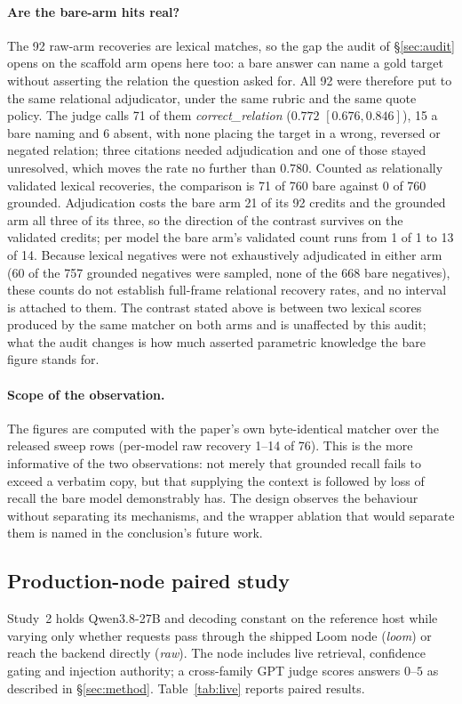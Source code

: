\documentclass[10pt,twocolumn]{article}
\begin{document}
\paragraph{Are the bare-arm hits real?} The 92 raw-arm recoveries are lexical matches, so the gap the audit of \S\ref{sec:audit} opens on the scaffold arm opens here too: a bare answer can name a gold target without asserting the relation the question asked for. All 92 were therefore put to the same relational adjudicator, under the same rubric and the same quote policy. The judge calls 71 of them \emph{correct\_relation} ($0.772$ $[0.676,0.846]$), 15 a bare naming and 6 absent, with none placing the target in a wrong, reversed or negated relation; three citations needed adjudication and one of those stayed unresolved, which moves the rate no further than $0.780$. Counted as relationally validated lexical recoveries, the comparison is 71 of 760 bare against 0 of 760 grounded. Adjudication costs the bare arm 21 of its 92 credits and the grounded arm all three of its three, so the direction of the contrast survives on the validated credits; per model the bare arm's validated count runs from 1 of 1 to 13 of 14. Because lexical negatives were not exhaustively adjudicated in either arm (60 of the 757 grounded negatives were sampled, none of the 668 bare negatives), these counts do not establish full-frame relational recovery rates, and no interval is attached to them. The contrast stated above is between two lexical scores produced by the same matcher on both arms and is unaffected by this audit; what the audit changes is how much asserted parametric knowledge the bare figure stands for.

\paragraph{Scope of the observation.} The figures are computed with the paper's own byte-identical matcher over the released sweep rows (per-model raw recovery 1--14 of 76). This is the more informative of the two observations: not merely that grounded recall fails to exceed a verbatim copy, but that supplying the context is followed by loss of recall the bare model demonstrably has. The design observes the behaviour without separating its mechanisms, and the wrapper ablation that would separate them is named in the conclusion's future work.

\subsection{Production-node paired study}\label{sec:live}
Study~2 holds Qwen3.8-27B and decoding constant on the reference host while varying only whether requests pass through the shipped Loom node (\emph{loom}) or reach the backend directly (\emph{raw}). The node includes live retrieval, confidence gating and injection authority; a cross-family GPT judge scores answers $0$--$5$ as described in \S\ref{sec:method}. Table~\ref{tab:live} reports paired results.
\end{document}
